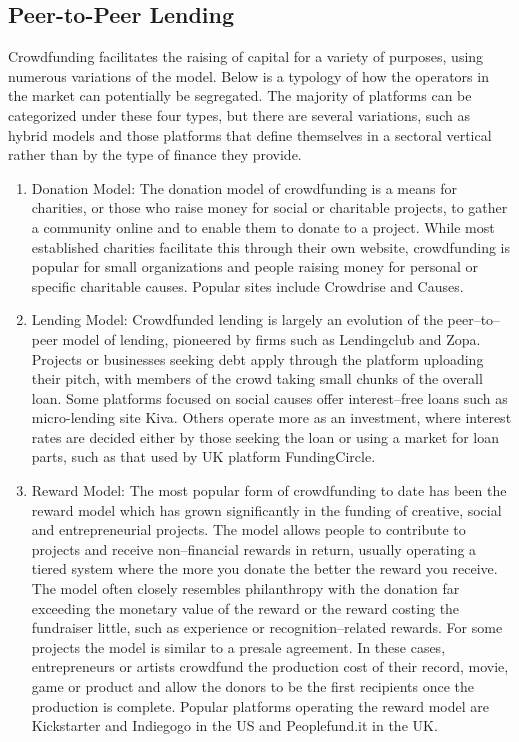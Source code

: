 \subsection*{ Peer-to-Peer Lending }
Crowdfunding facilitates the raising of capital for a variety of purposes, using numerous variations of the model. Below is a typology of how the operators in the market can potentially be segregated. The majority of platforms can be categorized under these four types, but there are several variations, such as hybrid models and those platforms that define themselves in a sectoral vertical rather than by the type of finance they provide.
\begin{enumerate}
      \item Donation Model:
            The donation model of crowdfunding is a means for charities, or those who raise money for social or charitable projects, to gather a community online and to enable them to donate to a project. While most established charities facilitate this through their own website, crowdfunding is popular for small organizations and people raising money for personal or specific charitable causes. Popular sites include Crowdrise and Causes.
      \item Lending Model:
            Crowdfunded lending is largely an evolution of the peer–to–peer model of lending, pioneered by firms such as Lendingclub and Zopa. Projects or businesses seeking debt apply through the platform uploading their pitch, with members of the crowd taking small chunks of the overall loan. Some platforms focused on social causes offer interest–free loans such as micro-lending site Kiva. Others operate more as an investment, where interest rates are decided either by those seeking the loan or using a market for loan parts, such as that used by UK platform FundingCircle.
      \item Reward Model:
            The most popular form of crowdfunding to date has been the reward model which has grown significantly in the funding of creative, social and entrepreneurial projects.
            The model allows people to contribute to projects and receive non–financial rewards in return, usually operating a tiered system where the more you donate the better the reward you receive. The model often closely resembles philanthropy with the donation far exceeding the monetary value of the reward or the reward costing the fundraiser little, such as experience or recognition–related rewards. For some projects the model is similar to a presale agreement.
            In these cases, entrepreneurs or artists crowdfund the production cost of their record, movie, game or product and allow the donors to be the first recipients once the production is complete. Popular platforms operating the reward model are Kickstarter and Indiegogo in the US and Peoplefund.it in the UK.

\end{enumerate}
